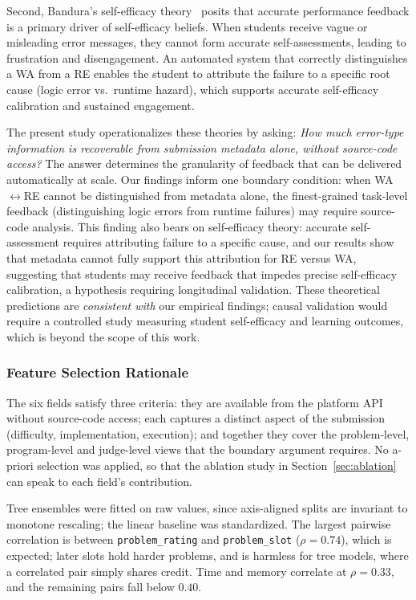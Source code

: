 \documentclass[acmsmall]{acmart}
\begin{document}
Second, Bandura's self-efficacy theory~\cite{bandura1997self} posits that
accurate performance feedback is a primary driver of self-efficacy beliefs.
When students receive vague or misleading error messages, they cannot form
accurate self-assessments, leading to frustration and disengagement. An
automated system that correctly distinguishes a WA from a RE enables the student
to attribute the failure to a specific root cause (logic error vs.\ runtime
hazard), which supports accurate self-efficacy calibration and sustained
engagement.

The present study operationalizes these theories by asking: \textit{How much
error-type information is recoverable from submission metadata alone, without
source-code access?} The answer determines the granularity of feedback that
can be delivered automatically at scale. Our findings inform one boundary condition:
when WA$\leftrightarrow$RE cannot be distinguished from metadata alone, the finest-grained
task-level feedback (distinguishing logic errors from runtime failures) may require
source-code analysis. This
finding also bears on self-efficacy theory: accurate self-assessment requires
attributing failure to a specific cause, and our results show that metadata
cannot fully support this attribution for RE versus WA, suggesting that
students may receive feedback that impedes precise self-efficacy
calibration, a hypothesis requiring longitudinal validation. These theoretical
predictions are \emph{consistent with} our empirical findings; causal validation
would require a controlled study measuring student self-efficacy and learning
outcomes, which is beyond the scope of this work.

\subsubsection*{Feature Selection Rationale}

The six fields satisfy three criteria: they are available from the platform API
without source-code access; each captures a distinct aspect of the submission
(difficulty, implementation, execution); and together they cover the
problem-level, program-level and judge-level views that the boundary argument
requires. No a-priori selection was applied, so that the ablation study in
Section~\ref{sec:ablation} can speak to each field's contribution.

Tree ensembles were fitted on raw values, since axis-aligned splits are
invariant to monotone rescaling; the linear baseline was standardized. The
largest pairwise correlation is between \texttt{problem\_rating} and
\texttt{problem\_slot} ($\rho=0.74$), which is expected; later slots hold
harder problems, and is harmless for tree models, where a correlated pair
simply shares credit. Time and memory correlate at $\rho=0.33$, and the
remaining pairs fall below $0.40$.
\end{document}
